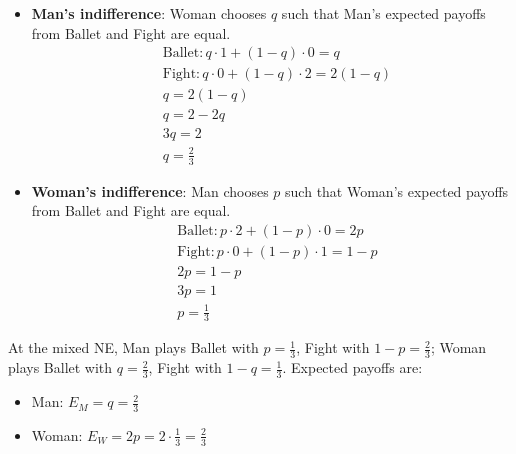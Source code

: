 \documentclass[a4paper,12pt]{article}
\begin{document}
\begin{itemize}
\item \textbf{Man's indifference}: Woman chooses $q$ such that Man's expected payoffs from Ballet and Fight are equal.
\begin{align*}
&\text{Ballet}: q \cdot 1 + (1-q) \cdot 0 = q \\
&\text{Fight}: q \cdot 0 + (1-q) \cdot 2 = 2(1-q) \\
&q = 2(1-q) \\
&q = 2 - 2q \\
&3q = 2 \\
&q = \frac{2}{3}
\end{align*}
\item \textbf{Woman's indifference}: Man chooses $p$ such that Woman's expected payoffs from Ballet and Fight are equal.
\begin{align*}
&\text{Ballet}: p \cdot 2 + (1-p) \cdot 0 = 2p \\
&\text{Fight}: p \cdot 0 + (1-p) \cdot 1 = 1-p \\
&2p = 1-p \\
&3p = 1 \\
&p = \frac{1}{3}
\end{align*}
\end{itemize}

At the mixed NE, Man plays Ballet with $p = \frac{1}{3}$, Fight with $1-p = \frac{2}{3}$; Woman plays Ballet with $q = \frac{2}{3}$, Fight with $1-q = \frac{1}{3}$. Expected payoffs are:
\begin{itemize}
\item Man: $E_M = q = \frac{2}{3}$
\item Woman: $E_W = 2p = 2 \cdot \frac{1}{3} = \frac{2}{3}$
\end{itemize}
\end{document}
